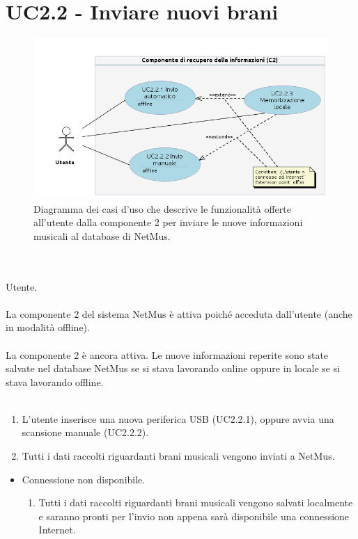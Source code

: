 \section{UC2.2 - Inviare nuovi brani}
\begin{figure}[h]
  \centering
  \includegraphics[width=15cm]{img/AR/UC2_2.png}
\caption{Diagramma dei casi d'uso che descrive le funzionalit\`a offerte
all'utente dalla componente 2 per inviare le nuove informazioni musicali al
database di NetMus.}
\end{figure}

\newpage
\vspace*{0.5cm}
\\\\
 Utente. \\\\ 
 La componente 2 del sistema NetMus \`e attiva poich\'e acceduta
dall'utente (anche in modalit\`a offline). \\\\
 La componente 2 \`e ancora attiva. Le nuove informazioni
reperite sono state salvate nel database NetMus se si stava lavorando online
oppure in locale se si stava lavorando offline.\\\\ 
\begin{enumerate}
  \item L'utente inserisce una nuova periferica USB (UC2.2.1), oppure avvia una
  scansione manuale (UC2.2.2).
  \item Tutti i dati raccolti riguardanti brani musicali vengono inviati a
  NetMus.
\end{enumerate}
\begin{itemize}
  \item Connessione non disponibile.
  \begin {enumerate}
    \item Tutti i dati raccolti riguardanti brani musicali vengono salvati
    localmente e saranno pronti per l'invio non appena sar\`a disponibile una
    connessione Internet.
  \end{enumerate}
\end{itemize}
\newpage



